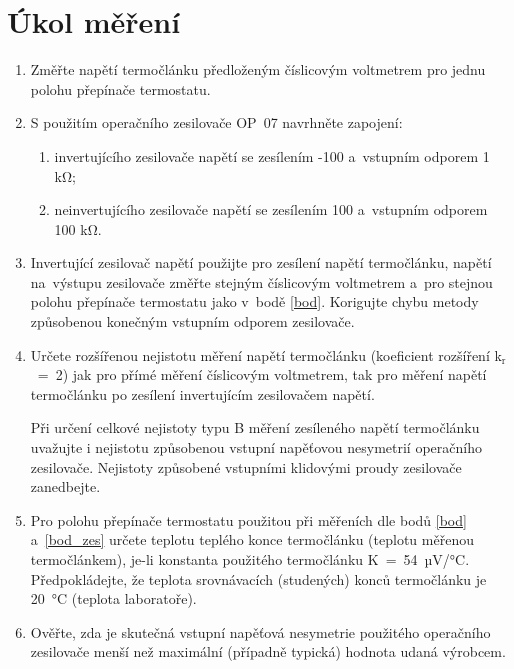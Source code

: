 \documentclass[a4paper,12pt]{article}   %
\newcommand{\sub}[1]{$_\textrm{#1}$}
\begin{document}
\section{Úkol měření}
\label{zadani}
\begin{enumerate}
    \item Změřte napětí termočlánku předloženým číslicovým voltmetrem pro jednu polohu přepínače termostatu. \label{bod}
    \item S použitím operačního zesilovače OP~07 navrhněte zapojení:
    \begin{enumerate}[label=\alph*)]
        \item invertujícího zesilovače napětí se zesílením -100 a~vstupním odporem 1 kΩ;
        \item neinvertujícího zesilovače napětí se zesílením 100 a~vstupním odporem 100 kΩ.
    \end{enumerate}
    \item Invertující zesilovač napětí použijte pro zesílení napětí termočlánku, napětí na~výstupu zesilovače změřte stejným číslicovým voltmetrem a~pro stejnou polohu přepínače termostatu jako v~bodě \ref{bod}. Korigujte chybu metody způsobenou konečným vstupním odporem zesilovače.\label{bod_zes}
    
    \item Určete rozšířenou nejistotu měření napětí termočlánku (koeficient rozšíření k\sub{r}~=~2) jak pro přímé měření číslicovým voltmetrem, tak pro měření napětí termočlánku po zesílení invertujícím zesilovačem napětí.
    
    Při určení celkové nejistoty typu B měření zesíleného napětí termočlánku uvažujte i nejistotu způsobenou vstupní napěťovou nesymetrií operačního zesilovače. Nejistoty způsobené vstupními klidovými proudy zesilovače zanedbejte.
    
    \item Pro polohu přepínače termostatu použitou při měřeních dle bodů \ref{bod} a~\ref{bod_zes} určete teplotu teplého konce termočlánku (teplotu měřenou termočlánkem), je-li konstanta použitého termočlánku K~=~54~µV/°C. Předpokládejte, že teplota srovnávacích (studených) konců termočlánku je 20~°C (teplota laboratoře).
    
    \item Ověřte, zda je skutečná vstupní napěťová nesymetrie použitého operačního zesilovače menší než maximální (případně typická) hodnota udaná výrobcem. 
\end{enumerate}
\end{document}

